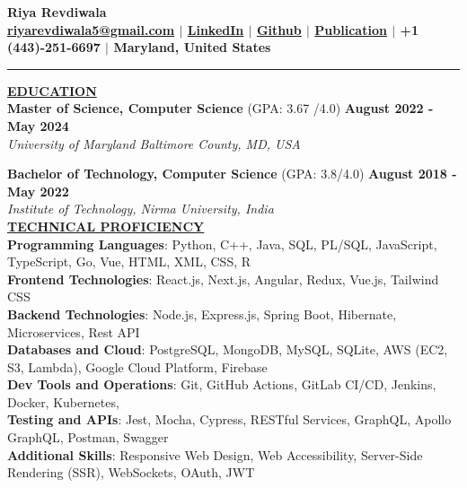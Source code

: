 \documentclass{article}
\begin{document}
\begin{center}
\thispagestyle{empty}
\large \textbf{Riya Revdiwala \\}
\normalsize \textbf{\href{mailto:riyarevdiwala5@gmail.com}{riyarevdiwala5@gmail.com} $\mid$ \href{https://www.linkedin.com/in/riya-revdiwala/}{LinkedIn} $\mid$ \href{https://github.com/riyarevdiwala}{Github} $\mid$ \href{https://www.igi-global.com/gateway/article/304726}{Publication} $\mid$ +1 (443)-251-6697 $\mid$ Maryland, United States \\}
\rule{\textwidth}{1pt}
\end{center}


\noindent \textbf{\underline{EDUCATION}} \\
\textbf{Master of Science, Computer Science} (GPA: 3.67 /4.0)  \hfill \textbf{August 2022 - May 2024} \\
\textit{University of Maryland Baltimore County, MD, USA}\\
\begin{itemize}[noitemsep,nolistsep,leftmargin=*]
\end{itemize}
\textbf{Bachelor of Technology, Computer Science} (GPA: 3.8/4.0) \hfill \textbf{August 2018 - May 2022} \\
\textit{Institute of Technology, Nirma University, India} \\


\noindent \textbf{\underline{TECHNICAL PROFICIENCY}} \\
\textbf{Programming Languages}{: \small Python, C++, Java, SQL, PL/SQL, JavaScript, TypeScript, Go, Vue, HTML, XML, CSS, R} \\
\textbf{Frontend Technologies}{: \small React.js, Next.js, Angular, Redux, Vue.js, Tailwind CSS} \\
\textbf{Backend Technologies}{: \small Node.js, Express.js, Spring Boot, Hibernate, Microservices, Rest API} \\
\textbf{Databases and Cloud}{: \small PostgreSQL, MongoDB, MySQL, SQLite, AWS (EC2, S3, Lambda), Google Cloud Platform, Firebase} \\
\textbf{Dev Tools and Operations}{: \small Git, GitHub Actions, GitLab CI/CD, Jenkins, Docker, Kubernetes,} \\
\textbf{Testing and APIs}{: \small Jest, Mocha, Cypress, RESTful Services, GraphQL, Apollo GraphQL, Postman, Swagger} \\
\textbf{Additional Skills}{: \small Responsive Web Design, Web Accessibility, Server-Side Rendering (SSR), WebSockets, OAuth, JWT} \\
\end{document}
